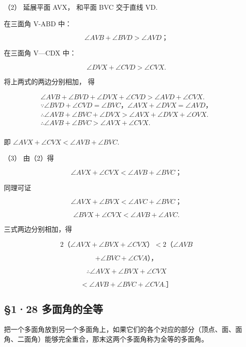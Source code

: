 （2） 延展平面 AVX， 和平面 BVC 交于直线 VD.

在三面角 V-ABD 中：

\[
\angle A V B + \angle B V D > \angle A V D\text{；}
\]

在三面角 V---CDX 中：

\[
\angle D V X + \angle C V D > \angle C V X.
\]

将上两式的两边分别相加， 得

\[
\begin{array}{l} \angle A V B + \angle B V D + \angle D V X + \angle C V D > \angle A V D + \angle C V X. \\ \because \angle B V D + \angle C V D = \angle B V C\text{，} \angle A V X + \angle D V X = \angle A V D\text{，} \\ \therefore \angle A V B + \angle B V C + \angle D V X > \angle A V X + \angle D V X + \angle O V X. \\ \therefore \angle A V B + \angle B V C > \angle A V X + \angle C V X. \\ \end{array}
\]

即 \(\angle AVX + \angle CVX < \angle AVB + \angle BVC.\)

（3） 由（2）得

\[
\angle A V X + \angle C V X <   \angle A V B + \angle B V C\text{；}
\]

同理可证

\[
\angle A V X + \angle B V X <   \angle A V C + \angle B V C\text{；}
\]

\[
\angle B V X + \angle C V X <   \angle A V B + \angle A V C.
\]

三式两边分别相加，得

\[
2 \text{（}\angle A V X + \angle B V X + \angle C V X\text{）} <   2 \text{（}\angle A V B
\]

\[
+ \angle B V C + \angle C V A\text{），}
\]

\[
\therefore \angle A V X + \angle B V X + \angle C V X
\]

\[
<   \angle A V B + \angle B V C + \angle C V A. \text{］}
\]

\subsection{§1·28
多面角的全等}

把一个多面角放到另一个多面角上，如果它们的各个对应的部分（顶点、面、面角、二面角）能够完全重合，那末这两个多面角称为全等的多面角。

